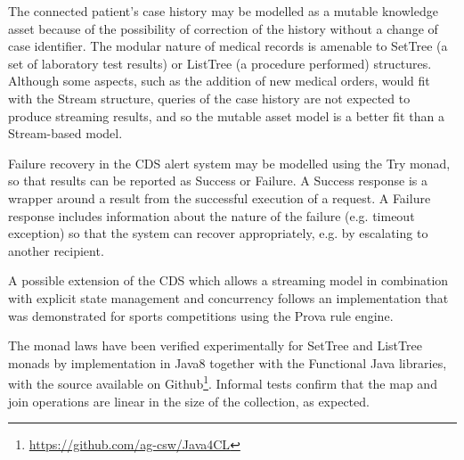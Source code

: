 \documentclass[runningheads]{llncs}
\begin{document}
The connected patient's case history may be modelled as a mutable knowledge asset  because of the possibility of correction of the history without a change of case identifier. The modular nature of medical records is amenable to SetTree (a set of laboratory test results) or ListTree (a procedure performed) structures. Although some aspects, such as the addition of new medical orders, would fit with the Stream structure, queries of the case history are not expected to produce streaming results, and so the mutable asset model is a better fit than a Stream-based model.

Failure recovery in the CDS alert system may be modelled using the Try monad, so that results can be reported as Success or Failure. A Success response is a wrapper around a result from the successful execution of a request. A Failure response includes information about the nature of the failure (e.g. timeout exception) so that the system can recover appropriately, e.g. by escalating to another recipient.

A possible extension of the CDS which allows a streaming model in combination with explicit state management and concurrency follows an implementation\cite{JefferyKP09} that was demonstrated for sports competitions using the Prova rule engine\cite{Prova2012}. 


The monad laws have been verified experimentally for SetTree and ListTree monads by implementation in Java8 together with the Functional Java libraries, with the source available on Github\footnote{\url{https://github.com/ag-csw/Java4CL}}. Informal tests confirm that the map and join operations are linear in the size of the collection, as expected.
\end{document}
